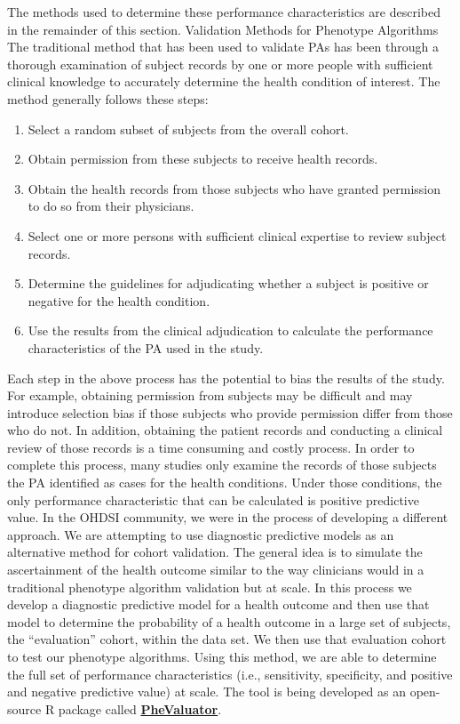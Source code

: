\documentclass[11pt]{book}
\theoremstyle{definition}
\theoremstyle{definition}
\theoremstyle{definition}
\theoremstyle{remark}
\begin{document}
The methods used to determine these performance characteristics are described in the remainder of this section.
Validation Methods for Phenotype Algorithms
The traditional method that has been used to validate PAs has been through a thorough examination of subject records by one or more people with sufficient clinical knowledge to accurately determine the health condition of interest. The method generally follows these steps:

\begin{enumerate}
\def\labelenumi{\arabic{enumi})}
\item
  Select a random subset of subjects from the overall cohort.
\item
  Obtain permission from these subjects to receive health records.
\item
  Obtain the health records from those subjects who have granted permission to do so from their physicians.
\item
  Select one or more persons with sufficient clinical expertise to review subject records.
\item
  Determine the guidelines for adjudicating whether a subject is positive or negative for the health condition.
\item
  Use the results from the clinical adjudication to calculate the performance characteristics of the PA used in the study.
\end{enumerate}

Each step in the above process has the potential to bias the results of the study. For example, obtaining permission from subjects may be difficult and may introduce selection bias if those subjects who provide permission differ from those who do not. In addition, obtaining the patient records and conducting a clinical review of those records is a time consuming and costly process. In order to complete this process, many studies only examine the records of those subjects the PA identified as cases for the health conditions. Under those conditions, the only performance characteristic that can be calculated is positive predictive value.
In the OHDSI community, we were in the process of developing a different approach. We are attempting to use diagnostic predictive models as an alternative method for cohort validation. The general idea is to simulate the ascertainment of the health outcome similar to the way clinicians would in a traditional phenotype algorithm validation but at scale. In this process we develop a diagnostic predictive model for a health outcome and then use that model to determine the probability of a health outcome in a large set of subjects, the ``evaluation'' cohort, within the data set. We then use that evaluation cohort to test our phenotype algorithms. Using this method, we are able to determine the full set of performance characteristics (i.e., sensitivity, specificity, and positive and negative predictive value) at scale. The tool is being developed as an open-source R package called \href{https://github.com/OHDSI/PheValuator}{\textbf{PheValuator}}. 
\end{document}
